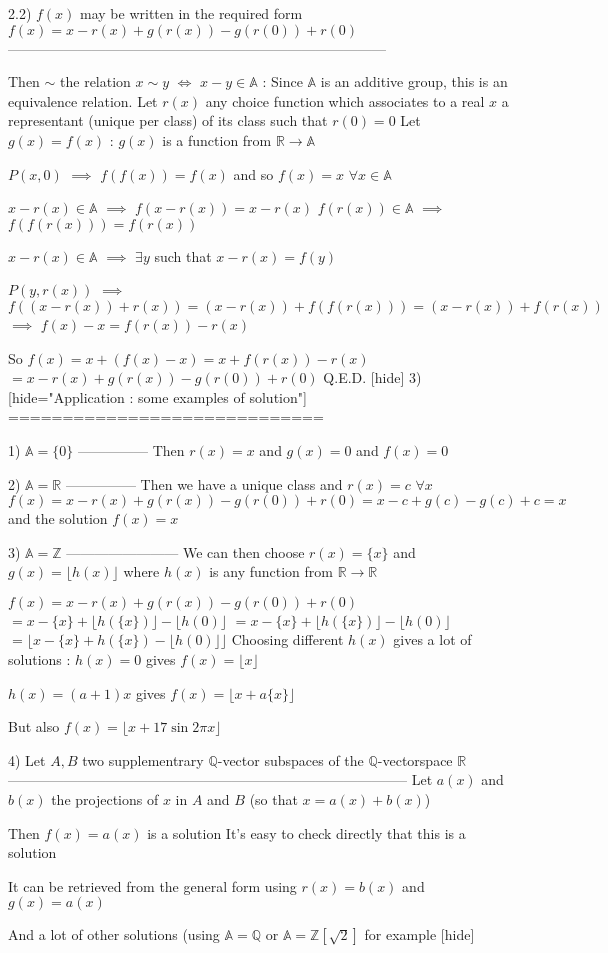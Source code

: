 \begin{solution}
2.2) $f(x)$ may be written in the required form $f(x)=x-r(x)+g(r(x))-g(r(0))+r(0)$
---------------------------------------------------------------------------------

Then $\sim$ the relation $x\sim y$ $\iff$ $x-y\in\mathbb A$ : Since $\mathbb A$ is an additive group, this is an equivalence relation.
Let $r(x)$ any choice function which associates to a real $x$ a representant (unique per class) of its class such that $r(0)=0$
Let $g(x)=f(x)$ : $g(x)$ is a function from $\mathbb R\to\mathbb A$

$P(x,0)$ $\implies$ $f(f(x))=f(x)$  and so $f(x)=x$ $\forall x\in\mathbb A$

$x-r(x)\in\mathbb A$ $\implies$ $f(x-r(x))=x-r(x)$
$f(r(x))\in\mathbb A$ $\implies$ $f(f(r(x)))=f(r(x))$

$x-r(x)\in\mathbb A$ $\implies$ $\exists y$ such that $x-r(x)=f(y)$

$P(y,r(x))$ $\implies$ $f((x-r(x))+r(x))=(x-r(x))+f(f(r(x)))=(x-r(x))+f(r(x))$ $\implies$ $f(x)-x=f(r(x))-r(x)$

So $f(x)=x+(f(x)-x)=x+f(r(x))-r(x)$ $=x-r(x)+g(r(x))-g(r(0))+r(0)$
Q.E.D.
[\/hide]
3) [hide="Application : some examples of solution"]
=============================

1) $\mathbb A=\{0\}$
---------------
Then $r(x)=x$ and $g(x)=0$ and $\boxed{f(x)=0}$

2) $\mathbb A=\mathbb R$
---------------
Then we have a unique class and $r(x)=c$ $\forall x$
$f(x)=x-r(x)+g(r(x))-g(r(0))+r(0)=x-c+g(c)-g(c)+c=x$ and the solution $\boxed{f(x)=x}$

3) $\mathbb A=\mathbb Z$
------------------------
We can then choose $r(x)=\{x\}$ and $g(x)=\lfloor h(x)\rfloor$ where $h(x)$ is any function from $\mathbb R\to\mathbb R$

$f(x)=x-r(x)+g(r(x))-g(r(0))+r(0)$ $=x-\{x\}+\lfloor h(\{x\})\rfloor-\lfloor h(0)\rfloor$ $=x-\{x\}+\lfloor h(\{x\})\rfloor-\lfloor h(0)\rfloor$ $=\lfloor x-\{x\}+h(\{x\})- \lfloor h(0)\rfloor\rfloor$
Choosing different $h(x)$ gives a lot of solutions :
$h(x)=0$  gives $\boxed{f(x)=\lfloor x\rfloor}$

$h(x)=(a+1)x$ gives $\boxed{f(x)=\lfloor x+a\{x\}\rfloor}$

But also $\boxed{f(x)=\lfloor x+17\sin 2\pi x\rfloor}$

4) Let $A,B$ two supplementrary $\mathbb Q$-vector subspaces of the $\mathbb Q$-vectorspace $\mathbb R$
--------------------------------------------------------------------------------------
Let $a(x)$ and $b(x)$ the projections of $x$ in $A$ and $B$ (so that $x=a(x)+b(x)$)

Then $\boxed{f(x)=a(x)}$ is a solution
It's easy to check directly that this is a solution

It can be retrieved from the general form using $r(x)=b(x)$ and $g(x)=a(x)$

And a lot of other solutions (using $\mathbb A=\mathbb Q$ or $\mathbb A=\mathbb Z[\sqrt 2]$ for example
[\/hide]
\end{solution}



